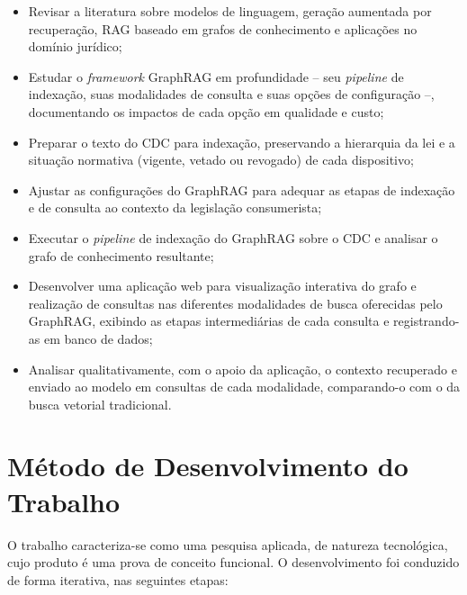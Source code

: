 \begin{itemize}
    \item Revisar a literatura sobre modelos de linguagem, geração aumentada por recuperação, RAG baseado em grafos de conhecimento e aplicações no domínio jurídico;
    \item Estudar o \textit{framework} GraphRAG em profundidade -- seu \textit{pipeline} de indexação, suas modalidades de consulta e suas opções de configuração --, documentando os impactos de cada opção em qualidade e custo;
    \item Preparar o texto do CDC para indexação, preservando a hierarquia da lei e a situação normativa (vigente, vetado ou revogado) de cada dispositivo;
    \item Ajustar as configurações do GraphRAG para adequar as etapas de indexação e de consulta ao contexto da legislação consumerista;
    \item Executar o \textit{pipeline} de indexação do GraphRAG sobre o CDC e analisar o grafo de conhecimento resultante;
    \item Desenvolver uma aplicação web para visualização interativa do grafo e realização de consultas nas diferentes modalidades de busca oferecidas pelo GraphRAG, exibindo as etapas intermediárias de cada consulta e registrando-as em banco de dados;
    \item Analisar qualitativamente, com o apoio da aplicação, o contexto recuperado e enviado ao modelo em consultas de cada modalidade, comparando-o com o da busca vetorial tradicional.
\end{itemize}

\section{Método de Desenvolvimento do Trabalho}
\label{sec-intro-met}

O trabalho caracteriza-se como uma pesquisa aplicada, de natureza tecnológica, cujo produto é uma prova de conceito funcional. O desenvolvimento foi conduzido de forma iterativa, nas seguintes etapas:

